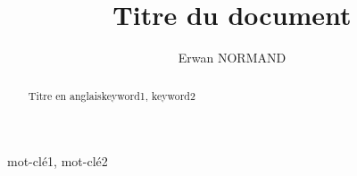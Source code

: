\documentclass[letterpaper, twoside, 12pt,%
  memoire, francais, creativecommons, hyperref, withAlgo2e%
]{thETS}
\title{Titre du document}
\author{Erwan NORMAND}
\begin{document}

\maketitle

\presentjury

\begin{avantpropos}
  
\end{avantpropos}

\begin{remerciements}
  
\end{remerciements}

\begin{sommaire}{mot-clé1, mot-clé2}
  
\end{sommaire}

\begin{abstract}{Titre en anglais}{keyword1, keyword2}
  
\end{abstract}

\tableofcontents
\listoftables
\listoffigures

\begin{listofabbr}[3cm]
  
\end{listofabbr}

%  

\cleardoublepage
{}
\reversemarginpar

\begin{introduction}
  
\end{introduction}

\begin{revuedelitterature}
  
\end{revuedelitterature}





\begin{conclusion}
  
\end{conclusion}

%

\newpage
\begin{spacing}{1}
  \nocite{*}
  
  
\end{spacing}
\end{document}
